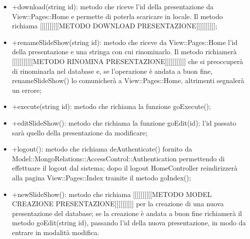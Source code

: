{{\begin{itemize}
						\item +download(string id): metodo che riceve l'id della presentazione da View::Pages::Home e permette di poterla scaricare in locale. Il metodo richiama [[[[[[[[[[METODO DOWNLOAD PRESENTAZIONE]]]]]]]]]];
						\item +renameSlideShow(string id): metodo che riceve da View::Pages::Home l'id della presentazione e una stringa con cui rinominarlo. Il metodo richiamerà [[[[[[[[[[[METODO RINOMINA PRESENTAZIONE]]]]]]]]]]] che si preoccuperà di rinominarla nel database e, se l'operazione è andata a buon fine, renameSlideShow() lo comunicherà a View::Pages::Home, altrimenti segnalerà un errore;
						\item +execute(string id): metodo che richiama la funzione goExecute();
						\item +editSlideShow(): metodo che richiama la funzione goEdit(id); l'id passato sarà quello della presentazione da modificare;
						\item +logout(): metodo che richiama deAuthenticate() fornito da Model::MongoRelations::AccessControl::Authentication permettendo di effettuare il logout dal sistema; dopo il logout HomeController reindirizzerà alla pagina View::Pages::Index tramite il metodo goIndex();
						\item +newSlideShow(): metodo che richiama [[[[[[[[[[METODO MODEL CREAZIONE PRESENTAZIONE]]]]]]]]]] per la creazione di una nuova presentazione del database; se la creazione è andata a buon fine richiamerà il metodo goEdit(string id), passando l'id della nuova presentazione, in modo da entrare in modalità modifica.
					\end{itemize}
				}
}
